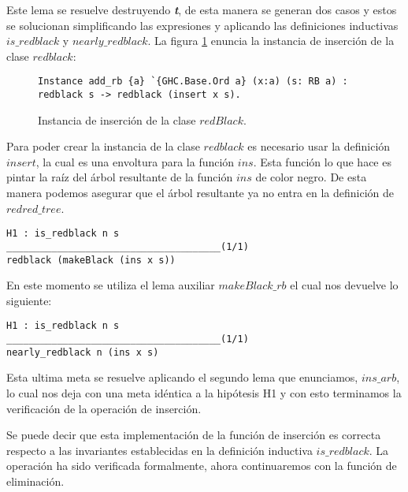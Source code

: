 Este lema se resuelve destruyendo \textit{\textbf{t}}, de esta manera se generan dos casos y estos se solucionan
simplificando las expresiones y aplicando las definiciones inductivas $is\_redblack$ y
$nearly\_redblack$.
La figura \ref{instance_ins} enuncia la instancia de inserci\'on de la clase $redblack$:

\begin{figure}[!ht]
\centering
\captionsetup{justification=centering}
\begin{verbatim}
Instance add_rb {a} `{GHC.Base.Ord a} (x:a) (s: RB a) :
redblack s -> redblack (insert x s).
\end{verbatim}
\caption{Instancia de inserci\'on de la clase $redBlack$.}
\label{instance_ins}
\end{figure}

Para poder crear la instancia de la clase $redblack$ es necesario usar la definici\'on $insert$,
la cual es una envoltura para la funci\'on $ins$. Esta funci\'on lo que hace es pintar la
ra\'iz del \'arbol resultante de la funci\'on $ins$ de color negro. De esta manera podemos
asegurar que el \'arbol resultante ya no entra en la definici\'on de $redred\_tree$.

\begin{verbatim}
H1 : is_redblack n s
______________________________________(1/1)
redblack (makeBlack (ins x s))
\end{verbatim}

En este momento se utiliza el lema auxiliar $makeBlack\_rb$ el cual nos devuelve lo siguiente:

\begin{verbatim}
H1 : is_redblack n s
______________________________________(1/1)
nearly_redblack n (ins x s)
\end{verbatim}

Esta ultima meta se resuelve aplicando el segundo lema que enunciamos, $ins\_arb$, lo cual nos deja
con una meta idéntica a la hipótesis H1 y con esto terminamos la verificaci\'on de la operaci\'on
de inserci\'on.

Se puede decir que esta implementaci\'on de la funci\'on de inserci\'on es correcta
respecto a las invariantes establecidas en la definici\'on inductiva $is\_redblack$. La operaci\'on ha
sido verificada formalmente, ahora continuaremos con la funci\'on de eliminaci\'on.
